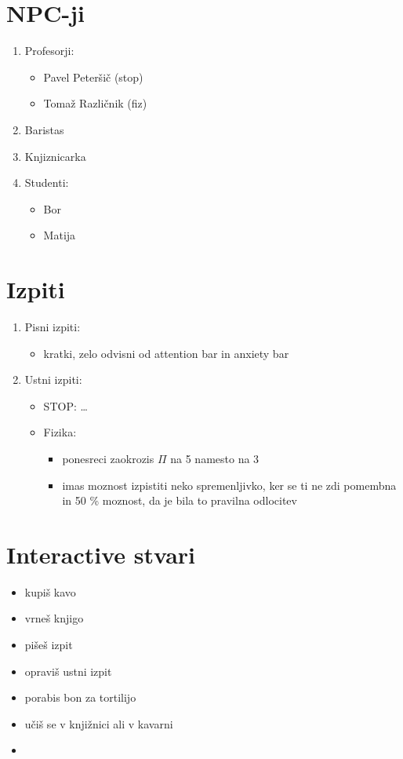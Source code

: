 \documentclass[a4paper]{article}
\begin{document}
\section{NPC-ji}
\begin{enumerate}
    \item Profesorji: \begin{itemize}
        \item Pavel Peteršič (stop)
        \item Tomaž Različnik (fiz)
    \end{itemize}
    \item Baristas
    \item Knjiznicarka
    \item Studenti: \begin{itemize}
        \item Bor
        \item Matija
    \end{itemize}
\end{enumerate}

\section{Izpiti}
\begin{enumerate}
    \item Pisni izpiti: \begin{itemize}
        \item kratki, zelo odvisni od attention bar in anxiety bar
    \end{itemize}

    \item Ustni izpiti: \begin{itemize}
        \item STOP: \ldots
        \item Fizika: \begin{itemize}
            \item ponesreci zaokrozis $\Pi$ na 5 namesto na 3
            \item imas moznost izpistiti neko spremenljivko, ker se ti ne zdi pomembna in 50 \% moznost, da je bila to pravilna odlocitev
        \end{itemize}
    \end{itemize}
\end{enumerate}

\section{Interactive stvari}
\begin{itemize}
    \item kupiš kavo
    \item vrneš knjigo
    \item pišeš izpit
    \item opraviš ustni izpit
    \item porabis bon za tortilijo
    \item učiš se v knjižnici ali v kavarni
    \item 
\end{itemize}
\end{document}
